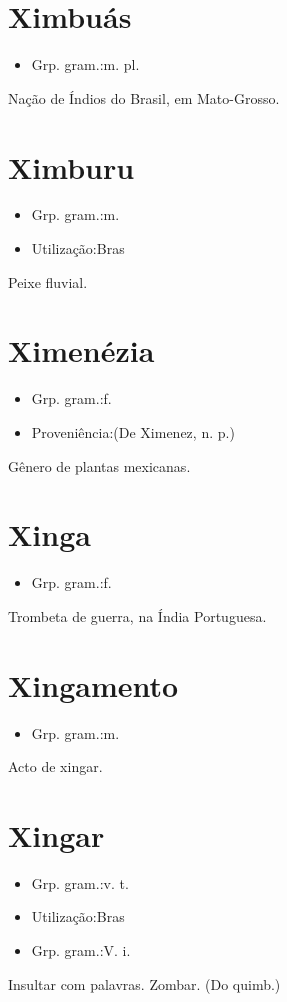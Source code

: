\section{Ximbuás}
\begin{itemize}
\item {Grp. gram.:m. pl.}
\end{itemize}
Nação de Índios do Brasil, em Mato-Grosso.
\section{Ximburu}
\begin{itemize}
\item {Grp. gram.:m.}
\end{itemize}
\begin{itemize}
\item {Utilização:Bras}
\end{itemize}
Peixe fluvial.
\section{Ximenézia}
\begin{itemize}
\item {Grp. gram.:f.}
\end{itemize}
\begin{itemize}
\item {Proveniência:(De \textunderscore Ximenez\textunderscore , n. p.)}
\end{itemize}
Gênero de plantas mexicanas.
\section{Xinga}
\begin{itemize}
\item {Grp. gram.:f.}
\end{itemize}
Trombeta de guerra, na Índia Portuguesa.
\section{Xingamento}
\begin{itemize}
\item {Grp. gram.:m.}
\end{itemize}
Acto de xingar.
\section{Xingar}
\begin{itemize}
\item {Grp. gram.:v. t.}
\end{itemize}
\begin{itemize}
\item {Utilização:Bras}
\end{itemize}
\begin{itemize}
\item {Grp. gram.:V. i.}
\end{itemize}
Insultar com palavras.
Zombar.
(Do quimb.)
